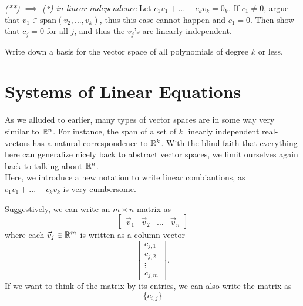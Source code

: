 \exercises
\begin{exerciselist}
	\item \textit{(**) $\implies$ (*) in linear independence} Let $c_1v_1+\ldots + c_kv_k=0_V$. If $c_1\neq 0$, argue that $v_1\in \textrm{span}(v_2,...,v_k)$, thus this case cannot happen and $c_1=0$. Then show that $c_j=0$ for all $j$, and thus the $v_j$'s are linearly independent.
	\item Write down a basis for the vector space of all polynomials of degree $k$ or less. 
\end{exerciselist}
\section{Systems of Linear Equations}
As we alluded to earlier, many types of vector spaces are in some way very similar to $\mathbb{R}^n$. For instance, the span of a set of $k$ linearly independent real-vectors has a natural correspondence to $\mathbb{R}^k$.
With the blind faith that everything here can generalize nicely back to abstract vector spaces, we limit ourselves again back to talking about $\mathbb{R}^n$.\\
Here, we introduce a new notation to write linear combiantions, as $c_1v_1+...+c_kv_k$ is very cumbersome.
\begin{notation}
	Suggestively, we can write an $m\times n$ matrix as \[
	\begin{bmatrix}
		\vec{v}_1 & \vec{v}_2 & ... & \vec{v}_n
	\end{bmatrix}
	\]
	where each $\vec{v}_j\in\mathbb{R}^m$ is written as a column vector\[
	\begin{bmatrix}
		c_{j,1} \\ c_{j,2}\\ \vdots \\ c_{j,m}
	\end{bmatrix}.
	\]
	If we want to think of the matrix by its entries, we can also write the matrix as \[
	\{c_{i,j}\}
	\]
\end{notation}
